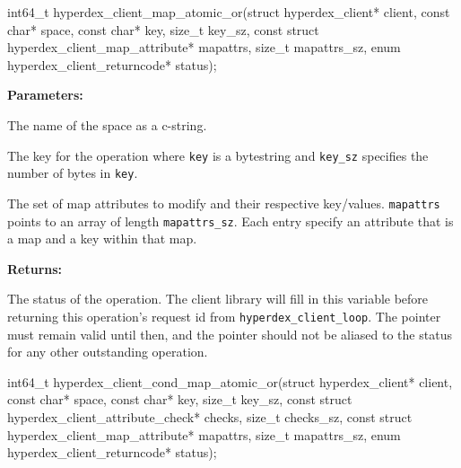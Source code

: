 \funcsep
{}
\begin{ccode}
int64_t hyperdex_client_map_atomic_or(struct hyperdex_client* client,
                const char* space,
                const char* key, size_t key_sz,
                const struct hyperdex_client_map_attribute* mapattrs, size_t mapattrs_sz,
                enum hyperdex_client_returncode* status);
\end{ccode}
\funcdesc 

\noindent\textbf{Parameters:}
\begin{description}[labelindent=\widthof{{\texttt{mapattrs}, \texttt{mapattrs\_sz}}},leftmargin=*,noitemsep,nolistsep,align=right]
\item[\texttt{space}] The name of the space as a c-string.
\item[\texttt{key}, \texttt{key\_sz}] The key for the operation where \texttt{key} is a bytestring and \texttt{key\_sz} specifies the number of bytes in \texttt{key}.
\item[\texttt{mapattrs}, \texttt{mapattrs\_sz}] The set of map attributes to modify and their respective key/values.  \texttt{mapattrs} points to an array of length \texttt{mapattrs\_sz}.  Each entry specify an attribute that is a map and a key within that map.
\end{description}

\noindent\textbf{Returns:}
\begin{description}[labelindent=\widthof{{\texttt{status}}},leftmargin=*,noitemsep,nolistsep,align=right]
\item[\texttt{status}] The status of the operation.  The client library will fill in this variable before returning this operation's request id from \texttt{hyperdex\_client\_loop}.  The pointer must remain valid until then, and the pointer should not be aliased to the status for any other outstanding operation.
\end{description}

\funcsep
{}
\begin{ccode}
int64_t hyperdex_client_cond_map_atomic_or(struct hyperdex_client* client,
                const char* space,
                const char* key, size_t key_sz,
                const struct hyperdex_client_attribute_check* checks, size_t checks_sz,
                const struct hyperdex_client_map_attribute* mapattrs, size_t mapattrs_sz,
                enum hyperdex_client_returncode* status);
\end{ccode}
\funcdesc 

